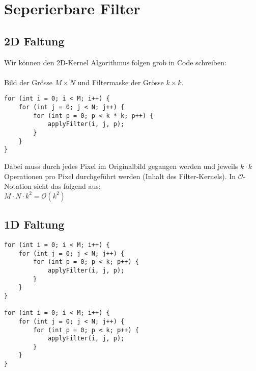 \documentclass{article} %
\begin{document}
\section{Seperierbare Filter}
\subsection{2D Faltung}

Wir können den 2D-Kernel Algorithmus folgen grob in Code schreiben:\\ \\
Bild der Grösse $M \times N$ und Filtermaske der Grösse $k \times k$.

\begin{lstlisting}
for (int i = 0; i < M; i++) {
	for (int j = 0; j < N; j++) {
		for (int p = 0; p < k * k; p++) {
			applyFilter(i, j, p);
		}
	}
}
\end{lstlisting}

Dabei muss durch jedes Pixel im Originalbild gegangen werden und jeweils $k \cdot k$ Operationen pro Pixel durchgeführt werden (Inhalt des Filter-Kernels). In $\mathcal{O}$-Notation sieht das folgend aus: \\
$M \cdot N \cdot k^2 = \mathcal{O}(k^2)$

\subsection{1D Faltung}

\begin{lstlisting}
for (int i = 0; i < M; i++) {
	for (int j = 0; j < N; j++) {
		for (int p = 0; p < k; p++) {
			applyFilter(i, j, p);
		}
	}
}

for (int i = 0; i < M; i++) {
	for (int j = 0; j < N; j++) {
		for (int p = 0; p < k; p++) {
			applyFilter(i, j, p);
		}
	}
}
\end{lstlisting}
\end{document}
